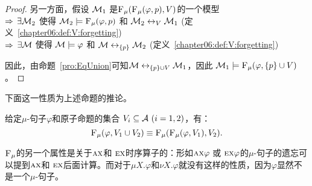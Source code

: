 \begin{proof}
	另一方面，假设 ${\cal M}_1$ 是${\textsc{F}_{\textsc{$\mu$}}}({\textsc{F}_{\textsc{$\mu$}}}(\varphi, p), V)$的一个模型 \\
	$\Rightarrow$ $\exists {\cal M}_2$ 使得 ${\cal M}_2 \models  {\textsc{F}_{\textsc{$\mu$}}}(\varphi, p)$ 和 ${\cal M}_2 \leftrightarrow_V {\cal M}_1$ \hfill(定义~\ref{chapter06:def:V:forgetting})\\
	$\Rightarrow$ $\exists {\cal M}$ 使得 ${\cal M} \models \varphi$ 和 ${\cal M} \leftrightarrow_{\{p\}} {\cal M}_2$ \hfill(定义~\ref{chapter06:def:V:forgetting})
	
	因此，由命题~\ref{pro:EqUnion}可知${\cal M} \leftrightarrow_{\{p\} \cup V} {\cal M}_1$，因此 ${\cal M}_1 \models {\textsc{F}_{\textsc{$\mu$}}}(\varphi, \{p\} \cup V)$。
\end{proof}


下面这一性质为上述命题的推论。

\begin{corollary}[交换性]\label{chapter06:disTFV}
	给定$\mu$-句子$\varphi$和原子命题的集合 $V_i\subseteq{\cal A}~(i=1,2)$，有：
	\[
	{\textsc{F}_{\textsc{$\mu$}}}(\varphi, V_1 \cup V_2) \equiv {\textsc{F}_{\textsc{$\mu$}}}({\textsc{F}_{\textsc{$\mu$}}}(\varphi, V_1), V_2).
	\]
\end{corollary}

${\textsc{F}_{\textsc{$\mu$}}}$的另一个属性是关于$\textsc{a}\textsc{x}$和 $\textsc{e} \textsc{x}$时序算子的：形如$\textsc{a}\textsc{x} \varphi$ 或 $\textsc{e} \textsc{x} \varphi$的$\mu$-句子的遗忘可以提到$\textsc{a}\textsc{x}$和 $\textsc{e} \textsc{x}$后面计算。而对于$\mu X. \varphi$和$\nu X. \varphi$就没有这样的性质，因为$\varphi$显然不是一个$\mu$-句子。


